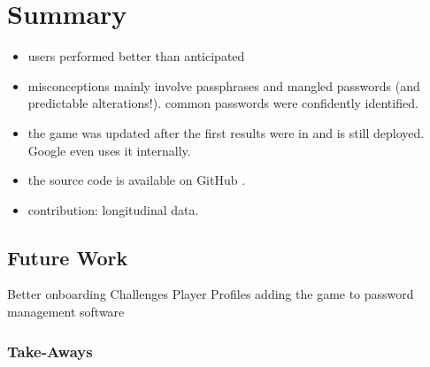 \section{Summary}
\begin{itemize}
	\item users performed better than anticipated
	\item misconceptions mainly involve passphrases and mangled passwords (and predictable alterations!). common passwords were confidently identified. 
	\item the game was updated after the first results were in and is still deployed. Google even uses it internally. 
	\item the source code is available on GitHub .
	\item contribution: longitudinal data.
\end{itemize}


\subsection{Future Work}
Better onboarding
Challenges
Player Profiles 
adding the game to password management software


\subsubsection{Take-Aways}



